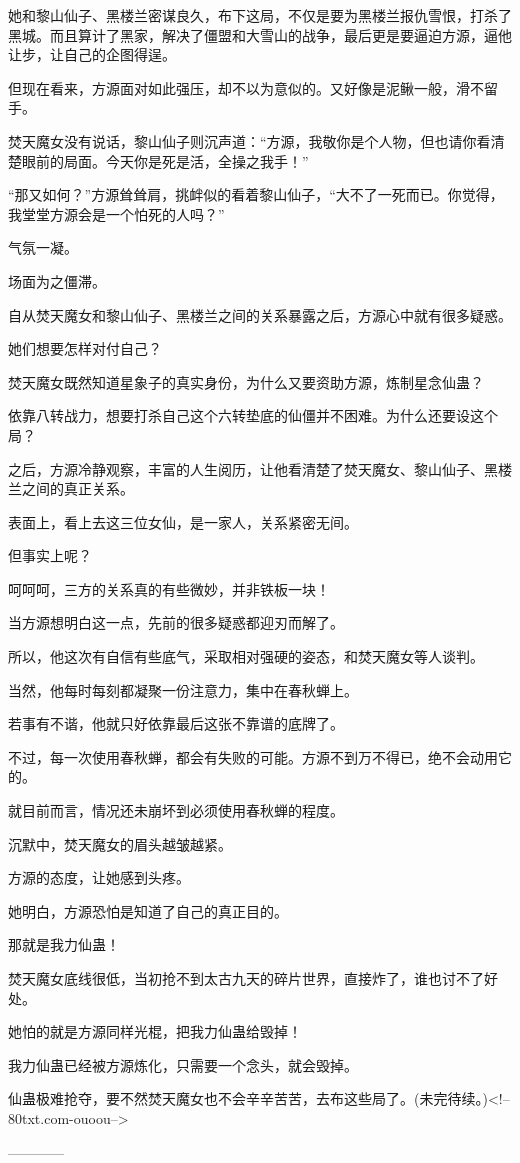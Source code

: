 \begin{this_body}
她和黎山仙子、黑楼兰密谋良久，布下这局，不仅是要为黑楼兰报仇雪恨，打杀了黑城。而且算计了黑家，解决了僵盟和大雪山的战争，最后更是要逼迫方源，逼他让步，让自己的企图得逞。

但现在看来，方源面对如此强压，却不以为意似的。又好像是泥鳅一般，滑不留手。

焚天魔女没有说话，黎山仙子则沉声道：“方源，我敬你是个人物，但也请你看清楚眼前的局面。今天你是死是活，全操之我手！”

“那又如何？”方源耸耸肩，挑衅似的看着黎山仙子，“大不了一死而已。你觉得，我堂堂方源会是一个怕死的人吗？”

气氛一凝。

场面为之僵滞。

自从焚天魔女和黎山仙子、黑楼兰之间的关系暴露之后，方源心中就有很多疑惑。

她们想要怎样对付自己？

焚天魔女既然知道星象子的真实身份，为什么又要资助方源，炼制星念仙蛊？

依靠八转战力，想要打杀自己这个六转垫底的仙僵并不困难。为什么还要设这个局？

之后，方源冷静观察，丰富的人生阅历，让他看清楚了焚天魔女、黎山仙子、黑楼兰之间的真正关系。

表面上，看上去这三位女仙，是一家人，关系紧密无间。

但事实上呢？

呵呵呵，三方的关系真的有些微妙，并非铁板一块！

当方源想明白这一点，先前的很多疑惑都迎刃而解了。

所以，他这次有自信有些底气，采取相对强硬的姿态，和焚天魔女等人谈判。

当然，他每时每刻都凝聚一份注意力，集中在春秋蝉上。

若事有不谐，他就只好依靠最后这张不靠谱的底牌了。

不过，每一次使用春秋蝉，都会有失败的可能。方源不到万不得已，绝不会动用它的。

就目前而言，情况还未崩坏到必须使用春秋蝉的程度。

沉默中，焚天魔女的眉头越皱越紧。

方源的态度，让她感到头疼。

她明白，方源恐怕是知道了自己的真正目的。

那就是我力仙蛊！

焚天魔女底线很低，当初抢不到太古九天的碎片世界，直接炸了，谁也讨不了好处。

她怕的就是方源同样光棍，把我力仙蛊给毁掉！

我力仙蛊已经被方源炼化，只需要一个念头，就会毁掉。

仙蛊极难抢夺，要不然焚天魔女也不会辛辛苦苦，去布这些局了。(未完待续。)<!--80txt.com-ouoou-->

------------

\end{this_body}

